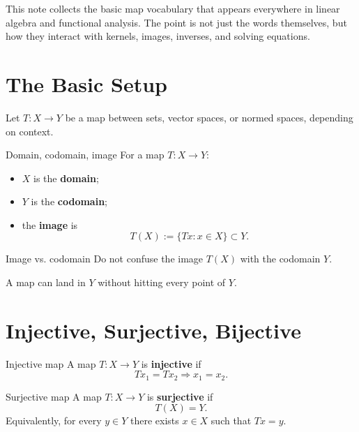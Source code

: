 \documentclass[header={Ancillary Note: Basic Mappings},notheorems]{study-note}
\begin{document}

\vspace{0.8em}

\begin{focusbox}
This note collects the basic map vocabulary that appears everywhere in linear algebra and functional analysis. The point is not just the words themselves, but how they interact with kernels, images, inverses, and solving equations.
\end{focusbox}

\tableofcontents

\section{The Basic Setup}

Let $T:X\to Y$ be a map between sets, vector spaces, or normed spaces, depending on context.

\begin{defbox}{Domain, codomain, image}
For a map $T:X\to Y$:
\begin{itemize}
\item $X$ is the \textbf{domain};
\item $Y$ is the \textbf{codomain};
\item the \textbf{image} is
\[
T(X):=\{Tx:x\in X\}\subset Y.
\]
\end{itemize}
\end{defbox}

\begin{warningbox}{Image vs. codomain}
Do not confuse the image $T(X)$ with the codomain $Y$.

A map can land in $Y$ without hitting every point of $Y$.
\end{warningbox}

\section{Injective, Surjective, Bijective}

\begin{defbox}{Injective map}
A map $T:X\to Y$ is \textbf{injective} if
\[
Tx_1=Tx_2 \Longrightarrow x_1=x_2.
\]
\end{defbox}

\begin{defbox}{Surjective map}
A map $T:X\to Y$ is \textbf{surjective} if
\[
T(X)=Y.
\]
Equivalently, for every $y\in Y$ there exists $x\in X$ such that $Tx=y$.
\end{defbox}
\end{document}
